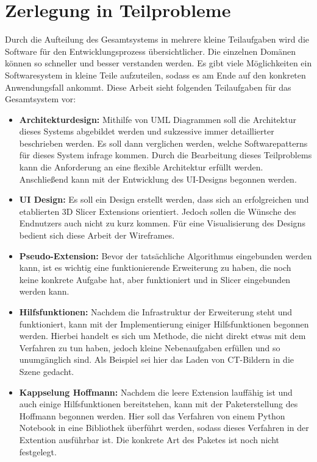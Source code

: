\section{Zerlegung in Teilprobleme}
\label{sec_zerlegung_in_teilprobleme} Durch die Aufteilung des Gesamtsystems in mehrere
kleine Teilaufgaben wird die Software für den Entwicklungsprozess übersichtlicher.
Die einzelnen Domänen können so schneller und besser verstanden werden. Es gibt viele
Möglichkeiten ein Softwaresystem in kleine Teile aufzuteilen, sodass es am Ende
auf den konkreten Anwendungsfall ankommt. Diese Arbeit sieht folgenden Teilaufgaben
für das Gesamtsystem vor:

\begin{itemize}
	\item \textbf{Architekturdesign:} Mithilfe von UML Diagrammen soll die
		Architektur dieses Systems abgebildet werden und sukzessive immer
		detaillierter beschrieben werden. Es soll dann verglichen werden, welche
		Softwarepatterns für dieses System infrage kommen. Durch die Bearbeitung dieses
		Teilproblems kann die Anforderung an eine flexible Architektur erfüllt werden.
		Anschließend kann mit der Entwicklung des UI-Designs begonnen werden.

	\item \textbf{UI Design:} Es soll ein Design erstellt werden, dass sich an erfolgreichen
		und etablierten 3D Slicer Extensions orientiert. Jedoch sollen die Wünsche
		des Endnutzers auch nicht zu kurz kommen. Für eine Visualisierung des Designs
		bedient sich diese Arbeit der Wireframes.

	\item \textbf{Pseudo-Extension:} Bevor der tatsächliche Algorithmus
		eingebunden werden kann, ist es wichtig eine funktionierende Erweiterung zu haben,
		die noch keine konkrete Aufgabe hat, aber funktioniert und in Slicer eingebunden
		werden kann.

	\item \textbf{Hilfsfunktionen:} Nachdem die Infrastruktur der Erweiterung
		steht und funktioniert, kann mit der Implementierung einiger Hilfsfunktionen
		begonnen werden. Hierbei handelt es sich um Methode, die nicht direkt etwas mit
		dem Verfahren zu tun haben, jedoch kleine Nebenaufgaben erfüllen und so
		unumgänglich sind. Als Beispiel sei hier das Laden von CT-Bildern in die Szene
		gedacht.

	\item \textbf{Kappselung Hoffmann:} Nachdem die leere Extension lauffähig ist
		und auch einige Hilfsfunktionen bereitstehen, kann mit der Paketerstellung des
		Hoffmann begonnen werden. Hier soll das Verfahren von einem Python Notebook
		in eine Bibliothek überführt werden, sodass dieses Verfahren in der Extention
		ausführbar ist. Die konkrete Art des Paketes ist noch nicht festgelegt.


\end{itemize}
